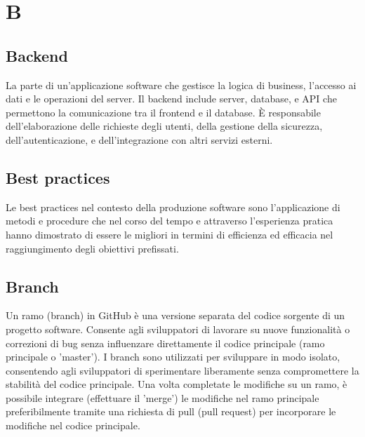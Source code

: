 \section*{B} 
\subsection*{Backend} 
La parte di un'applicazione software che gestisce la logica di business, l'accesso ai dati e le operazioni del server. Il backend include server, database, e API che permettono la comunicazione tra il frontend e il database. È responsabile dell'elaborazione delle richieste degli utenti, della gestione della sicurezza, dell'autenticazione, e dell'integrazione con altri servizi esterni.
\subsection*{Best practices} 
Le best practices nel contesto della produzione software sono l'applicazione di metodi e procedure che nel corso del tempo e attraverso l'esperienza pratica hanno dimostrato di essere le migliori in termini di efficienza ed efficacia nel raggiungimento degli obiettivi prefissati.
\subsection*{Branch} 
Un ramo (branch) in GitHub è una versione separata del codice sorgente di un progetto software. Consente agli sviluppatori di lavorare su nuove funzionalità o correzioni di bug senza influenzare direttamente il codice principale (ramo principale o 'master'). I branch sono utilizzati per sviluppare in modo isolato, consentendo agli sviluppatori di sperimentare liberamente senza compromettere la stabilità del codice principale. Una volta completate le modifiche su un ramo, è possibile integrare (effettuare il 'merge') le modifiche nel ramo principale preferibilmente tramite una richiesta di pull (pull request) per incorporare le modifiche nel codice principale.
